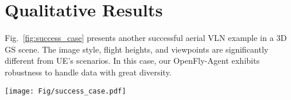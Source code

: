 \begin{comment}
\textbf{Get Landmark} 

\textbf{System}:You are an assistant who is proficient in image recognition. You can accurately identify the object in the picture and its characteristics that are different from the surrounding objects. I will give you the three final images you will see. Please focus on the last image and tell me the features of the target building and reply to me in the form of JSON.

\textbf{User}: The target building is at info'aim-landmark' of the image. Answer me a dictionary like color:--, feature: --, size: --, type: --.

\textbf{GPT 4o}: color: blue, feature: Steel, glass, size: medium size, type: building.



\textbf{Get Instruction }

\textbf{System}:You are an assistant proficient in text processing. You need to help me combine these scattered actions and landmarks into a sentence using words with similar meanings and more appropriate words, making them smooth, fluent, and accurate. If the landmarks of adjacent actions are similar or even identical, please use pronouns to refer to them.

\textbf{User}: Data: actions

\textbf{GPT 4o}: Move forward and slightly turn left to a high-rise building with a noticeable logo at the top. Then turn left and go straight to a futuristic tower with a large spherical structure in the middle.
\end{comment}

\section{Qualitative Results}
Fig.~\ref{fig:success_case} presents another successful aerial VLN example in a 3D GS scene. The image style, flight heights, and viewpoints are significantly different from UE's scenarios. In this case, our OpenFly-Agent exhibits robustness to handle data with great diversity. 


\begin{figure*}[t]
\centering
    \texttt{[image: Fig/success\_case.pdf]}
    \caption{Illustration of aerial VLN trajectories generated by OpenFly-Agent.}
    \label{fig:success_case}
\end{figure*}
